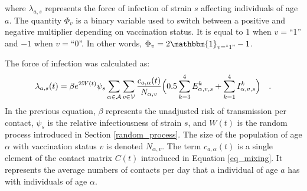 where $\lambda_{a,s}$ represents the force of infection of strain $s$ affecting individuals of age $a$. The quantity $\Phi_v$ is a binary variable
used to switch between a positive and negative multiplier depending on vaccination status. It is equal to $1$ when
$v=$``1'' and $-1$ when $v=$``0''. In other words, $\Phi_v = 2\mathbbm{1}_{v=``1"} - 1$. 

The force of infection was calculated as:
\begin{equation}
    \label{foi}
 \lambda_{a,s}(t) = \beta e^{2W(t)} \psi_{s} \sum_{\alpha \in \mathcal{A}} \sum_{v \in \mathcal{V}} \frac{c_{a,\alpha}(t)}{N_{\alpha, v}} \Bigl( 0.5 \sum_{k=3}^{4} E_{\alpha,v,s}^{k} + \sum_{k=1}^{4} I_{\alpha,v,s}^{k} \Bigr) \quad .
\end{equation}
In the previous equation, $\beta$ represents the unadjusted risk of transmission per contact, $\psi_{s}$ is the relative infectiousness of strain $s$, and $W(t)$ is
the random process introduced in Section \ref{random_process}. The size of the population of age $\alpha$ with vaccination status $v$ is denoted $N_{\alpha, v}$. The term $c_{a,\alpha}(t)$ is a single element of the contact matrix $C(t)$ introduced in Equation \ref{eq_mixing}. It
represents the average numbers of contacts per day that a individual of age $a$ has with individuals of age $\alpha$.